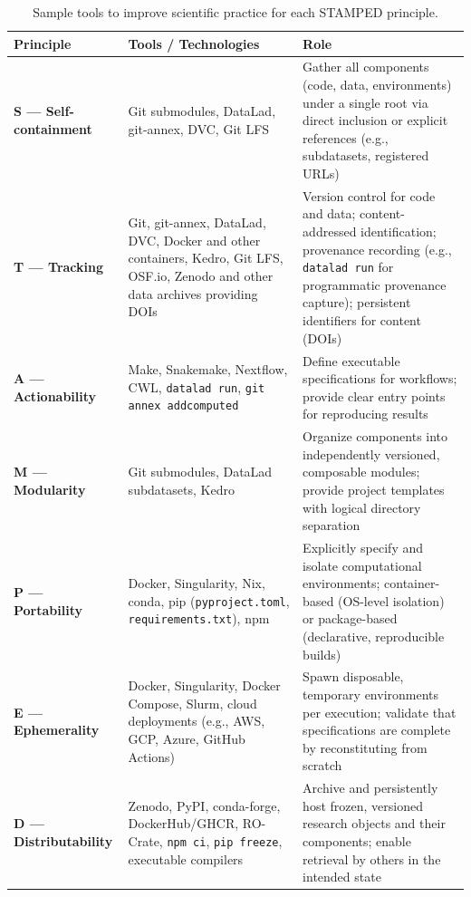 \documentclass{article}
\begin{document}
\begin{table}[htbp]
\centering
\caption{Sample tools to improve scientific practice for each STAMPED principle.}
\label{tab:stamped-tools}
\begin{tabular}{|l|p{}|p{}|}
\hline
\textbf{Principle} & \textbf{Tools / Technologies} & \textbf{Role} \\
\hline
\textbf{S — Self-containment} &
Git submodules, DataLad, git-annex, DVC, Git LFS &
Gather all components (code, data, environments) under a single root via direct inclusion or explicit references (e.g., subdatasets, registered URLs) \\
\hline
\textbf{T — Tracking} &
Git, git-annex, DataLad, DVC, Docker and other containers, Kedro, Git LFS, OSF.io, Zenodo and other data archives providing DOIs &
Version control for code and data; content-addressed identification; provenance recording (e.g., \texttt{datalad run} for programmatic provenance capture); persistent identifiers for content (DOIs) \\
\hline
\textbf{A — Actionability} &
Make, Snakemake, Nextflow, CWL, \texttt{datalad run}, \texttt{git annex addcomputed} &
Define executable specifications for workflows; provide clear entry points for reproducing results \\
\hline
\textbf{M — Modularity} &
Git submodules, DataLad subdatasets, Kedro &
Organize components into independently versioned, composable modules; provide project templates with logical directory separation \\
\hline
\textbf{P — Portability} &
Docker, Singularity, Nix, conda, pip (\texttt{pyproject.toml}, \texttt{requirements.txt}), npm &
Explicitly specify and isolate computational environments; container-based (OS-level isolation) or package-based (declarative, reproducible builds) \\
\hline
\textbf{E — Ephemerality} &
Docker, Singularity, Docker Compose, Slurm, cloud deployments (e.g., AWS, GCP, Azure, GitHub Actions) &
Spawn disposable, temporary environments per execution; validate that specifications are complete by reconstituting from scratch \\
\hline
\textbf{D — Distributability} &
Zenodo, PyPI, conda-forge, DockerHub/GHCR, RO-Crate, \texttt{npm ci}, \texttt{pip freeze}, executable compilers &
Archive and persistently host frozen, versioned research objects and their components; enable retrieval by others in the intended state \\
\hline
\end{tabular}
\end{table}
\end{document}
